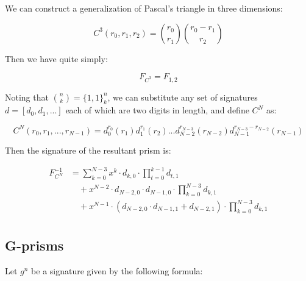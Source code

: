 \documentclass{article}
\begin{document}
\noindent We can construct a generalization of Pascal's triangle in three dimensions:

$$C^3 (r_0, r_1, r_2) = \binom{r_0}{r_1} \binom{r_0 - r_1}{r_2}$$

\noindent Then we have quite simply:

$$F_{C^3} = F_{1, 2}$$

\noindent Noting that $\binom{n}{k} = \{1, 1\}^{n}_k$, we can substitute any set of signatures $d = [d_0, d_1, ...]$ each of which are two digits in length, and define $C^N$ as:

\iffalse
$$C^3 (r_0, r_1, r_2) = d_{r_1}^{r_0} d_{r_2}^{r_0 - r_1}$$

\noindent Then we have the identity:

$$F_{C^3}^{-1} = d_0^2 + x d_1 (d_0 + 1)$$

\noindent This may be generalized to $N$ dimensions, again fixing $d$ to some two-digit signature:
\fi

$$C^N (r_0, r_1, ..., r_{N-1}) = d^{r_0}_{0}(r_1) d^{r_1}_{1}(r_2) ... d^{r_{N-3}}_{N-2}(r_{N-2}) d^{r_{N-3} - r_{N-2}}_{N-1}(r_{N-1})$$

\noindent Then the signature of the resultant prism is:

\begin{align*}
F^{-1}_{C^N} &= \sum_{k=0}^{N-3} x^k \cdot d_{k, 0} \cdot \prod_{t=0}^{k-1} d_{t, 1}\\
& \quad + x^{N-2} \cdot d_{N-2, 0} \cdot d_{N-1, 0} \cdot \prod_{k=0}^{N-3} d_{k, 1}\\
& \quad + x^{N-1} \cdot \left( d_{N-2, 0} \cdot d_{N-1, 1} + d_{N-2, 1} \right) \cdot \prod_{k=0}^{N-3} d_{k, 1}\\
\end{align*}

\iffalse
\noindent Then we have another recursive function:

$$I_0 = d^2_0 + x d_1 (d_0 + 1)$$

$$I_n = d_0 + x d_1 I_{n-1}$$

\noindent Then we have simply:

$$F_{C^N}^{-1} = I_{N-3}$$
\fi

\subsection{G-prisms}

\iffalse
\noindent Let $g^n$ be a signature given by the following formula:
\end{document}
